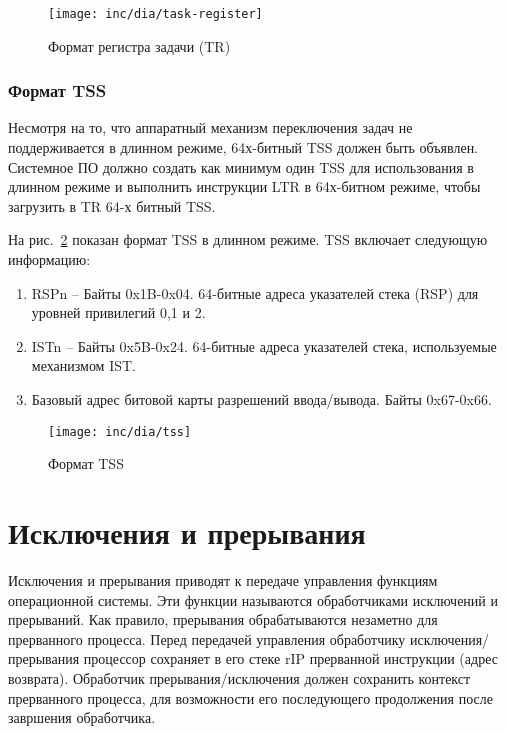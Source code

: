 \begin{figure}[ht!]
  \centering
  \texttt{[image: inc/dia/task-register]}
  \caption{Формат регистра задачи (TR)}
  \label{fig:task_register}
\end{figure}

\subsubsection*{Формат TSS}
Несмотря на то, что аппаратный механизм переключения задач не поддерживается в
длинном режиме, 64х-битный TSS должен быть объявлен. Системное ПО должно
создать как минимум один TSS для использования в длинном режиме и
выполнить инструкции LTR в 64х-битном режиме, чтобы загрузить в TR 64-х битный TSS.

На рис.~\ref{fig:tss} показан формат TSS в длинном режиме. TSS включает
следующую информацию:
\begin{enumerate}[1.]
\item RSPn -- Байты 0x1B-0x04. 64-битные адреса указателей стека (RSP) для
	уровней привилегий 0,1 и 2.
\item ISTn -- Байты 0x5B-0x24. 64-битные адреса указателей стека, используемые
	механизмом IST.
\item Базовый адрес битовой карты разрешений ввода/вывода. Байты 0x67-0x66.
\end{enumerate}

\begin{figure}[ht!]
  \centering
  \texttt{[image: inc/dia/tss]}
  \caption{Формат TSS}
  \label{fig:tss}
\end{figure}



\section{Исключения и прерывания}
\label{sec:exceptions_and_interrupts}

Исключения и прерывания приводят к передаче управления функциям операционной
системы. Эти функции называются обработчиками исключений и прерываний.
Как правило, прерывания обрабатываются незаметно для прерванного
процесса. Перед передачей управления обработчику исключения/прерывания
процессор сохраняет в его стеке rIP прерванной инструкции (адрес возврата).
Обработчик прерывания/исключения должен сохранить контекст прерванного процесса,
для возможности его последующего продолжения после завршения обработчика.

